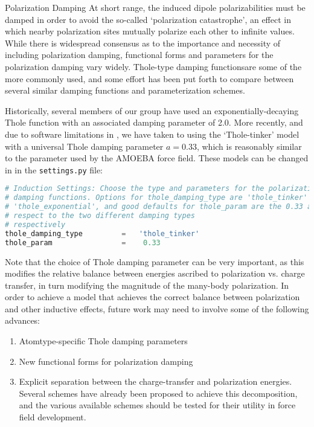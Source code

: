 

\begin{paragraph}{Polarization Damping}
At short range, the induced dipole polarizabilities must be damped in order to
avoid the so-called `polarization catastrophe', an effect in which nearby
polarization sites mutually polarize each other to 
infinite values. While there is widespread consensus as to the importance and
necessity of including polarization damping, functional forms and parameters
for the polarization damping vary widely.\cite{Cieplak2009,Lopes2009,Thole1981,Slipchenko2009,Wang2011}
Thole-type damping functions\footnotemark are some of the more commonly used, and some
effort has been put forth to compare between several similar damping functions
and parameterization schemes.\cite{Wang2011,Wang2012,Liu2017}

Historically,\cite{McDaniel2013} several members of our group have used an
exponentially-decaying Thole function with an associated damping parameter of
2.0.\cite{Yu2011} More recently, and due to software limitations in \openmm,
we have taken to using the `Thole-tinker' model with a universal Thole damping
parameter $a=0.33$, which is reasonably similar to the parameter used by the
AMOEBA force field.\cite{VanVleet2017} These models can be changed in \pointer
in the \verb|settings.py| file:
\begin{lstlisting}[language=python]
# Induction Settings: Choose the type and parameters for the polarization
# damping functions. Options for thole_damping_type are 'thole_tinker' and
# 'thole_exponential', and good defaults for thole_param are the 0.33 and 2.0 with
# respect to the two different damping types
# respectively
thole_damping_type         =   'thole_tinker'
thole_param                =    0.33
\end{lstlisting}
%
Note that the choice of Thole damping parameter can be very important, as this
modifies the relative balance between energies ascribed to polarization vs.
charge transfer, in turn modifying the magnitude of the many-body
polarization. In order to achieve a model that achieves the correct balance
between polarization and other inductive effects, future work may need to
involve some of the following advances:
\begin{enumerate}
\item Atomtype-specific Thole damping parameters
\item New functional forms for polarization damping
\item Explicit separation between the \sapt charge-transfer and polarization
energies. Several schemes have already been proposed to achieve this decomposition,
\cite{Bistoni2016,Misquitta2013,Horn2016b,Lao2016}
and the various available schemes should be tested for their utility in force field
development.
\end{enumerate}
\end{paragraph}

